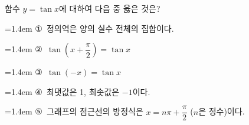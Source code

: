 함수 $y=\tan x$에 대하여 다음 중 옳은 것은?
\par\medskip\par\noindent\hangindent=1.4em {\small ①}\ 정의역은 양의 실수 전체의 집합이다.\par\noindent\hangindent=1.4em {\small ②}\ $\tan\left(x+\dfrac{\pi}{2}\right)=\tan x$\par\noindent\hangindent=1.4em {\small ③}\ $\tan (-x)=\tan x$\par\noindent\hangindent=1.4em {\small ④}\ 최댓값은 1, 최솟값은 $-1$이다.\par\noindent\hangindent=1.4em {\small ⑤}\ 그래프의 점근선의 방정식은 $x=n\pi+\dfrac{\pi}{2}$ ($n$은 정수)이다.\par\medskip
